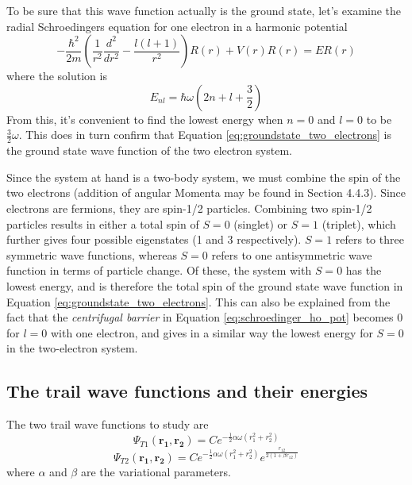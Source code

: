 \documentclass[12pt,english,a4paper]{article}
\begin{document}
To be sure that this wave function actually is the ground state, let's examine the radial Schroedingers equation for one electron in a harmonic potential
\begin{equation}
    -\frac{\hbar^2}{2m}\left(\frac{1}{r^2}\frac{d^2}{dr^2}-\frac{l\left(l+1\right)}{r^2}\right)R(r)+V(r)R(r)=ER(r)
    \label{eq:schroedinger_ho_pot}
\end{equation}
where the solution is
\begin{equation}
    E_{nl}=\hbar\omega\left(2n+l+\frac{3}{2}\right)
\end{equation}
From this, it's convenient to find the lowest energy when $n=0$ and $l=0$ to be $\frac{3}{2}\omega$. This does in turn confirm that Equation \eqref{eq:groundstate_two_electrons} is the ground state wave function of the two electron system.

Since the system at hand is a two-body system, we must combine the spin of the two electrons (addition of angular Momenta may be found in \cite{Griffiths} Section 4.4.3). Since electrons are fermions, they are spin-1/2 particles. Combining two spin-1/2 particles results in either a total spin of $S=0$ (singlet) or $S=1$ (triplet), which further gives four possible eigenstates (1 and 3 respectively). $S=1$ refers to three symmetric wave functions, whereas $S=0$ refers to one antisymmetric wave function in terms of particle change. Of these, the system with $S=0$ has the lowest energy, and is therefore the total spin of the ground state wave function in Equation \eqref{eq:groundstate_two_electrons}. This can also be explained from the fact that the \textit{centrifugal barrier} in Equation \eqref{eq:schroedinger_ho_pot} becomes $0$ for $l=0$ with one electron, and gives in a similar way the lowest energy for $S=0$ in the two-electron system.

\subsection{The trail wave functions and their energies} \label{section:theory:energies}

The two trail wave functions to study are
\begin{equation}
    \Psi_{T1}(\boldsymbol{r_1},\boldsymbol{r_2})=Ce^{-\frac{1}{2}\alpha\omega(r_1^2+r_2^2)}
    \label{eq:trail_one}
\end{equation}
\begin{equation}
    \Psi_{T2}(\boldsymbol{r_1},\boldsymbol{r_2})=Ce^{-\frac{1}{2}\alpha\omega(r_1^2+r_2^2)}e^{\frac{r_{12}}{2(1+\beta r_{12})}}
    \label{eq:trail_two}
\end{equation}
where $\alpha$ and $\beta$ are the variational parameters.
\end{document}
